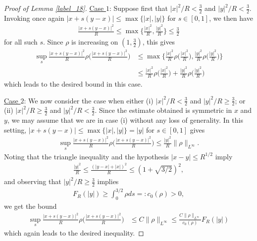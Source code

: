 \documentclass[reqno]{amsart}
\numberwithin{equation}{section}
\theoremstyle{remark}
\begin{document}
\begin{proof}[Proof of Lemma \ref{label_18}]
\noindent \underline{Case $1$}: Suppose first that $|x|^2/R<\frac{3}{2}$ and $|y|^2/R<\frac{3}{2}$.  Invoking once again $|x+s(y-x)|\leq \max\{|x|,|y|\}$ for $s\in [0,1]$, we then have
\begin{align*}
\frac{|x+s(y-x)|^2}{R}\leq \max\bigg\{\frac{|x|^2}{R},\frac{|y|^2}{R}\bigg\}\leq \frac{3}{2}
\end{align*}
for all such $s$.  Since $\rho$ is increasing on $(1,\frac{3}{2})$, this gives
\begin{align*}
\sup_s \frac{|x+s(y-x)|^2}{R}\rho\bigg(\frac{|x+s(y-x)|^2}{R}\bigg)&\leq \max\bigg\{\frac{|x|^2}{R}\rho\bigg(\frac{|x|^2}{R}\bigg),\frac{|y|^2}{R}\rho\bigg(\frac{|y|^2}{R}\bigg)\bigg\}\\
&\leq \frac{|x|^2}{R}\rho\bigg(\frac{|x|^2}{R}\bigg)+\frac{|y|^2}{R}\rho\bigg(\frac{|y|^2}{R}\bigg)
\end{align*}
which leads to the desired bound in this case.

\vspace{0.2in}

\noindent \underline{Case $2$}: We now consider the case when either (i) $|x|^2/R<\frac{3}{2}$ and $|y|^2/R\geq \frac{3}{2}$; or (ii) $|x|^2/R\geq \frac{3}{2}$ and $|y|^2/R<\frac{3}{2}$.  Since the estimate obtained is symmetric in $x$ and $y$, we may assume that we are in case (i) without any loss of generality.  In this setting, $|x+s(y-x)|\leq \max\{|x|,|y|\}=|y|$ for $s\in [0,1]$ gives
\begin{align*}
\sup_s \frac{|x+s(y-x)|^2}{R}\rho\bigg(\frac{|x+s(y-x)|^2}{R}\bigg)\leq \frac{|y|^2}{R}\lVert \rho\rVert_{L^\infty}.
\end{align*}
Noting that the triangle inequality and the hypothesis $|x-y|\leq R^{1/2}$ imply
\begin{align*}
\frac{|y|^2}{R}\leq \frac{(|y-x|+|x|)^2}{R}\leq (1+\sqrt{3/2})^2,
\end{align*}
and observing that $|y|^2/R\geq \frac{3}{2}$ implies
\begin{align}
F_R(|y|)\geq \int_0^{3/2} \rho ds=:c_0(\rho)>0,\label{label_25}
\end{align}
we get the bound
\begin{align*}
\sup_s \frac{|x+s(y-x)|^2}{R}\rho\bigg(\frac{|x+s(y-x)|^2}{R}\bigg)&\leq C\lVert \rho\rVert_{L^\infty}\leq \frac{C\lVert\rho\rVert_{L^\infty}}{c_0(\rho)}F_R(|y|)
\end{align*}
which again leads to the desired inequality.

\vspace{0.2in}


\end{proof}
\end{document}
